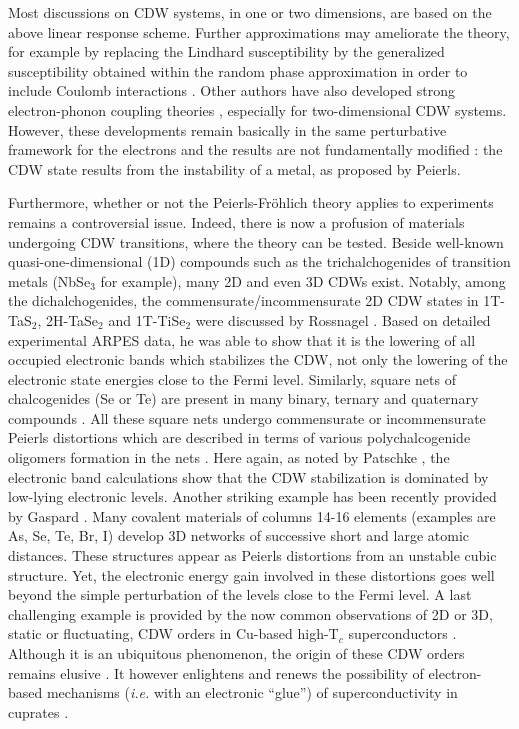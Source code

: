 \documentclass[]{revtex4-1}
\begin{document}
Most discussions on CDW systems, in one or two dimensions, are based on the above linear response scheme. Further approximations may ameliorate the theory, for example by replacing the Lindhard susceptibility by the generalized susceptibility obtained within the random phase approximation in order to include Coulomb interactions \cite{chan}. Other authors have also developed strong electron-phonon coupling theories \cite{chan, macmillan, varma, johannes}, especially for two-dimensional  CDW systems. However, these developments remain basically in the same perturbative framework for the electrons and the results are not fundamentally modified : the CDW state results from the instability of a metal, as proposed by Peierls.

Furthermore, whether or not the Peierls-Fr\"ohlich theory applies to experiments remains a controversial issue.
Indeed, there is now a profusion of materials undergoing CDW transitions, where the theory can be tested. Beside well-known quasi-one-dimensional (1D) compounds \cite{monceau,rouxel} such as the trichalchogenides of transition metals (NbSe$_3$ for example), many 2D and even 3D CDWs exist. Notably, among the dichalchogenides, the commensurate/incommensurate 2D CDW states in 1T-TaS$_2$, 2H-TaSe$_2$ and 1T-TiSe$_2$ were discussed by Rossnagel \cite{rossnagel}. Based on detailed experimental ARPES data, he was able to show that it is the lowering of all occupied electronic bands which stabilizes the CDW, not only the lowering of the electronic state energies close to the Fermi level. Similarly, square nets of chalcogenides (Se or Te) are present in many binary, ternary and quaternary compounds \cite{hoffman, patschke}. All these square nets undergo commensurate or incommensurate Peierls distortions which are described in terms of various polychalcogenide oligomers formation in the nets \cite{hoffman, patschke, malliakas_1,malliakas_2,malliakas_3}. Here again, as noted by Patschke \cite{patschke}, the electronic band calculations show that the CDW stabilization is dominated by low-lying electronic levels. Another striking example has been recently provided by Gaspard \cite{gaspard}. Many covalent materials of columns 14-16 elements (examples are As, Se, Te, Br, I) develop 3D networks of successive short and large atomic distances. These structures appear as Peierls distortions from an unstable cubic structure. Yet, the electronic energy gain involved in these distortions goes well beyond the simple perturbation of the levels close to the Fermi level. 
A last challenging example is provided by the now common observations of 2D or 3D, static or fluctuating, CDW orders in Cu-based high-T$_c$ superconductors \cite{wu, peng_1, blushke, peng_2, arpaia}. Although it is an ubiquitous phenomenon, the origin of these CDW orders remains elusive \cite{comin}. It however enlightens and renews the possibility of electron-based mechanisms (\textit{i.e.} with an electronic ``glue'') of superconductivity in cuprates \cite{quemerais_1,quemerais_2,ashcroft_2, mallett}.
\end{document}
